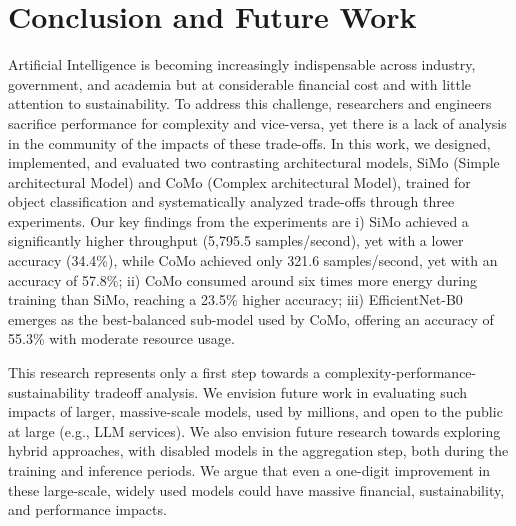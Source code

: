 \section{Conclusion and Future Work} \label{sec:conclusion}

Artificial Intelligence is becoming increasingly indispensable across industry, government, and academia but at considerable financial cost and with little attention to sustainability. To address this challenge, researchers and engineers sacrifice performance for complexity and vice-versa, yet there is a lack of analysis in the community of the impacts of these trade-offs. In this work, we designed, implemented, and evaluated two contrasting architectural models, SiMo (Simple architectural Model) and CoMo (Complex architectural Model), trained for object classification and systematically analyzed trade-offs through three experiments. Our key findings from the experiments are i) SiMo achieved a significantly higher throughput (5,795.5 samples/second), yet with a lower accuracy (34.4\%), while CoMo achieved only 321.6 samples/second, yet with an accuracy of 57.8\%; ii) CoMo consumed around six times more energy during training than SiMo, reaching a 23.5\% higher accuracy; iii) EfficientNet-B0 emerges as the best-balanced sub-model used by CoMo, offering an accuracy of 55.3\% with moderate resource usage.

This research represents only a first step towards a complexity-performance-sustainability tradeoff analysis. We envision future work in evaluating such impacts of larger, massive-scale models, used by millions, and open to the public at large (e.g., LLM services). We also envision future research towards exploring hybrid approaches, with disabled models in the aggregation step, both during the training and inference periods. We argue that even a one-digit improvement in these large-scale, widely used models could have massive financial, sustainability, and performance impacts.

 
